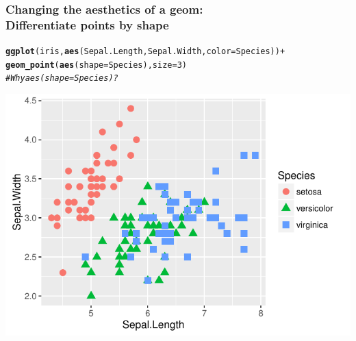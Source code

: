 \documentclass{beamer}\usepackage[]{graphicx}\usepackage[]{color}
\makeatletter
\newcommand{\hlnum}[1]{\textcolor[rgb]{0.686,0.059,0.569}{#1}}%
\newcommand{\hlcom}[1]{\textcolor[rgb]{0.678,0.584,0.686}{\textit{#1}}}%
\newcommand{\hlopt}[1]{\textcolor[rgb]{0,0,0}{#1}}%
\newcommand{\hlstd}[1]{\textcolor[rgb]{0.345,0.345,0.345}{#1}}%
\newcommand{\hlkwc}[1]{\textcolor[rgb]{0.333,0.667,0.333}{#1}}%
\newcommand{\hlkwd}[1]{\textcolor[rgb]{0.737,0.353,0.396}{\textbf{#1}}}%
\newenvironment{kframe}{%
 \def\at@end@of@kframe{}%
 \ifinner\ifhmode%
  \def\at@end@of@kframe{\end{minipage}}%
  \begin{minipage}{\columnwidth}%
 \fi\fi%
 \def\FrameCommand##1{\hskip\@totalleftmargin \hskip-\fboxsep
 \colorbox{shadecolor}{##1}\hskip-\fboxsep
     \hskip-\linewidth \hskip-\@totalleftmargin \hskip\columnwidth}%
 \MakeFramed {\advance\hsize-\width
   \@totalleftmargin\z@ \linewidth\hsize
   \@setminipage}}%
 {\par\unskip\endMakeFramed%
 \at@end@of@kframe}
\newenvironment{knitrout}{}{} %
\makeatother
\begin{document}
\begin{frame}[fragile]
\frametitle{Changing the aesthetics of a geom: \\Differentiate points by shape}
\begin{knitrout}\footnotesize
{}\color{fgcolor}\begin{kframe}
\begin{alltt}
\hlkwd{ggplot}\hlstd{(iris,} \hlkwd{aes}\hlstd{(Sepal.Length, Sepal.Width,} \hlkwc{color} \hlstd{= Species))} \hlopt{+}
    \hlkwd{geom_point}\hlstd{(}\hlkwd{aes}\hlstd{(}\hlkwc{shape} \hlstd{= Species),} \hlkwc{size} \hlstd{=} \hlnum{3}\hlstd{)}
\hlcom{# Why aes(shape = Species)?}
\end{alltt}
\end{kframe}

{\centering \includegraphics[width=.75\linewidth]{figure/first_plot_shape-1} 

}



\end{knitrout}
\end{frame}

\end{document}
